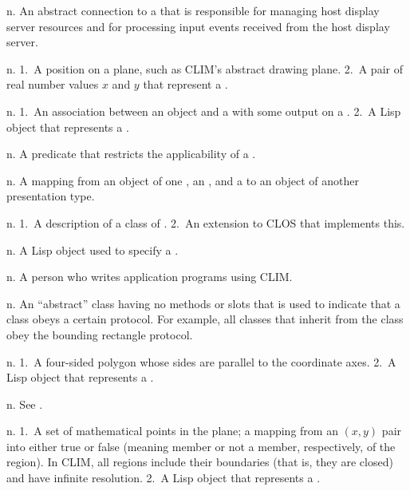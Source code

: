 \begin{description}
 {n.} {An abstract connection to a 
that is responsible for managing host display server resources and for
processing input events received from the host display server.}

 {n.} {1.~A position on a plane, such as CLIM's
abstract drawing plane.  2.~A pair of real number values $x$ and $y$ that
represent a .}

 {n.} {1.~An association between an object and a
 with some output on a .
2.~A Lisp object that represents a .}

 {n.} {A predicate that restricts the
applicability of a .}

 {n.} {A mapping from an object of one
, an , and a  to an
object of another presentation type.}

 {n.} {1.~A description of a class of
.  2.~An extension to CLOS that implements this.}

 {n.} {A Lisp object used to specify
a .}

 {n.} {A person who writes application programs using
CLIM.}

 {n.} {An ``abstract'' class having no methods or
slots that is used to indicate that a class obeys a certain protocol.  For
example, all classes that inherit from the  class obey
the bounding rectangle protocol.}

 {n.} {1.~A four-sided polygon whose sides are
parallel to the coordinate axes.  2.~A Lisp object that represents a
.}

 {n.} {See .}

 {n.} {1.~A set of mathematical points in the plane; a
mapping from an $(x,y)$ pair into either true or false (meaning member or not a
member, respectively, of the region).  In CLIM, all regions include their
boundaries (that is, they are closed) and have infinite resolution.  2.~A Lisp
object that represents a .}


\end{description}
